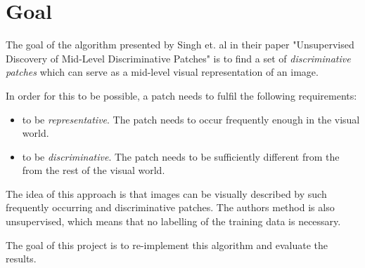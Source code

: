\section{Goal}

The goal of the algorithm presented by Singh et. al in their paper "Unsupervised Discovery of Mid-Level Discriminative Patches" 
is to find a set of \textit{discriminative patches} which can serve as a mid-level visual representation of an image.

In order for this to be possible, a patch needs to fulfil the following  requirements:

\begin{itemize}
\item to be \emph{representative}. The patch needs to occur frequently enough in the visual world. 
\item to be \emph{discriminative}. The patch needs to be sufficiently different from the from the rest of the visual world. 
\end{itemize}

The idea of this approach is that images can be visually described by such frequently occurring and discriminative patches. 
The authors method is also unsupervised, which means that no labelling of the training data is necessary.

The goal of this project is to re-implement this algorithm and evaluate the results.

